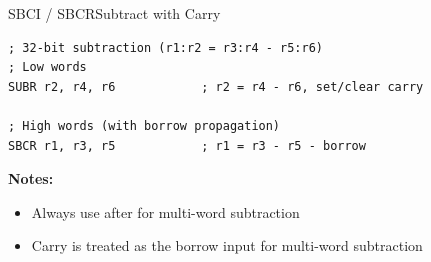 \begin{instructionbox}{SBCI / SBCR}{Subtract with Carry}
	\begin{example}
		\begin{lstlisting}
; 32-bit subtraction (r1:r2 = r3:r4 - r5:r6)
; Low words
SUBR r2, r4, r6            ; r2 = r4 - r6, set/clear carry

; High words (with borrow propagation)
SBCR r1, r3, r5            ; r1 = r3 - r5 - borrow
		\end{lstlisting}
		\caption{32-bit Subtraction with Borrow Propagation}
	\end{example}

	\textbf{Notes:}
	\begin{itemize}
		\item Always use after  for multi-word subtraction
		\item Carry is treated as the borrow input for multi-word subtraction
	\end{itemize}
\end{instructionbox}

